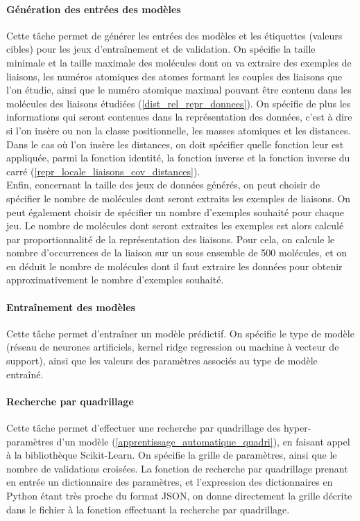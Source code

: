 \paragraph{Génération des entrées des modèles } Cette tâche permet de générer les entrées des modèles et les étiquettes (valeurs cibles) pour les jeux d'entraînement et de validation. On spécifie la taille minimale et la taille maximale des molécules dont on va extraire des exemples de liaisons, les numéros atomiques des atomes formant les couples des liaisons que l'on étudie, ainsi que le numéro atomique maximal pouvant être contenu dans les molécules des liaisons étudiées (\ref{dist_rel_repr_donnees}). On spécifie de plus les informations qui seront contenues dans la représentation des données, c'est à dire si l'on insère ou non la classe positionnelle, les masses atomiques et les distances. Dans le cas où l'on insère les distances, on doit spécifier quelle fonction leur est appliquée, parmi la fonction identité, la fonction inverse et la fonction inverse du carré (\ref{repr_locale_liaisons_cov_distances}).\\
Enfin, concernant la taille des jeux de données générés, on peut choisir de spécifier le nombre de molécules dont seront extraits les exemples de liaisons. On peut également choisir de spécifier un nombre d'exemples souhaité pour chaque jeu. Le nombre de molécules dont seront extraites les exemples est alors calculé par proportionnalité de la représentation des liaisons. Pour cela, on calcule le nombre d'occurrences de la liaison sur un sous ensemble de 500 molécules, et on en déduit le nombre de molécules dont il faut extraire les données pour obtenir approximativement le nombre d'exemples souhaité.

\paragraph{Entraînement des modèles} Cette tâche permet d'entraîner un modèle prédictif. On spécifie le type de modèle (réseau de neurones artificiels, kernel ridge regression ou machine à vecteur de support), ainsi que les valeurs des paramètres associés au type de modèle entraîné.

\paragraph{Recherche par quadrillage} Cette tâche permet d'effectuer une recherche par quadrillage des hyper-paramètres d'un modèle (\ref{apprentissage_automatique_quadri}), en faisant appel à la bibliothèque Scikit-Learn\cite{sklearn}. On spécifie la grille de paramètres, ainsi que le nombre de validations croisées. La fonction de recherche par quadrillage prenant en entrée un dictionnaire des paramètres, et l'expression des dictionnaires en Python étant très proche du format JSON, on donne directement la grille décrite dans le fichier à la fonction effectuant la recherche par quadrillage.

